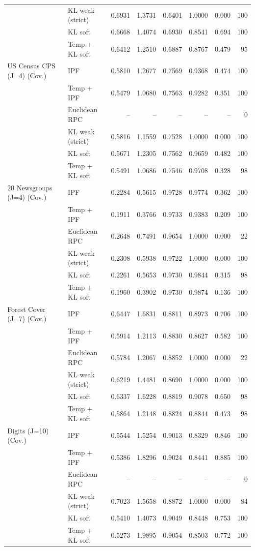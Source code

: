 \begin{longtable}{llrrrrrr}
 & KL weak (strict) & 0.6931 & 1.3731 & 0.6401 & 1.0000 & 0.000 & 100 \\
 & KL soft & 0.6668 & 1.4074 & 0.6930 & 0.8541 & 0.694 & 100 \\
 & Temp + KL soft & 0.6412 & 1.2510 & 0.6887 & 0.8767 & 0.479 & 95 \\
US Census CPS (J=4) (Cov.) & IPF & 0.5810 & 1.2677 & 0.7569 & 0.9368 & 0.474 & 100 \\
 & Temp + IPF & 0.5479 & 1.0680 & 0.7563 & 0.9282 & 0.351 & 100 \\
 & Euclidean RPC & -- & -- & -- & -- & -- & 0 \\
 & KL weak (strict) & 0.5816 & 1.1559 & 0.7528 & 1.0000 & 0.000 & 100 \\
 & KL soft & 0.5671 & 1.2305 & 0.7562 & 0.9659 & 0.482 & 100 \\
 & Temp + KL soft & 0.5491 & 1.0686 & 0.7546 & 0.9708 & 0.328 & 98 \\
20 Newsgroups (J=4) (Cov.) & IPF & 0.2284 & 0.5615 & 0.9728 & 0.9774 & 0.362 & 100 \\
 & Temp + IPF & 0.1911 & 0.3766 & 0.9733 & 0.9383 & 0.209 & 100 \\
 & Euclidean RPC & 0.2648 & 0.7491 & 0.9654 & 1.0000 & 0.000 & 22 \\
 & KL weak (strict) & 0.2308 & 0.5938 & 0.9722 & 1.0000 & 0.000 & 100 \\
 & KL soft & 0.2261 & 0.5653 & 0.9730 & 0.9844 & 0.315 & 98 \\
 & Temp + KL soft & 0.1960 & 0.3902 & 0.9730 & 0.9874 & 0.136 & 100 \\
Forest Cover (J=7) (Cov.) & IPF & 0.6447 & 1.6831 & 0.8811 & 0.8973 & 0.706 & 100 \\
 & Temp + IPF & 0.5914 & 1.2113 & 0.8830 & 0.8627 & 0.582 & 100 \\
 & Euclidean RPC & 0.5784 & 1.2067 & 0.8852 & 1.0000 & 0.000 & 22 \\
 & KL weak (strict) & 0.6219 & 1.4481 & 0.8690 & 1.0000 & 0.000 & 100 \\
 & KL soft & 0.6337 & 1.6228 & 0.8819 & 0.9078 & 0.650 & 98 \\
 & Temp + KL soft & 0.5864 & 1.2148 & 0.8824 & 0.8844 & 0.473 & 98 \\
Digits (J=10) (Cov.) & IPF & 0.5544 & 1.5254 & 0.9013 & 0.8329 & 0.846 & 100 \\
 & Temp + IPF & 0.5386 & 1.8296 & 0.9024 & 0.8441 & 0.885 & 100 \\
 & Euclidean RPC & -- & -- & -- & -- & -- & 0 \\
 & KL weak (strict) & 0.7023 & 1.5658 & 0.8872 & 1.0000 & 0.000 & 84 \\
 & KL soft & 0.5410 & 1.4073 & 0.9049 & 0.8448 & 0.753 & 100 \\
 & Temp + KL soft & 0.5273 & 1.9895 & 0.9054 & 0.8503 & 0.772 & 100 \\
\end{longtable}
